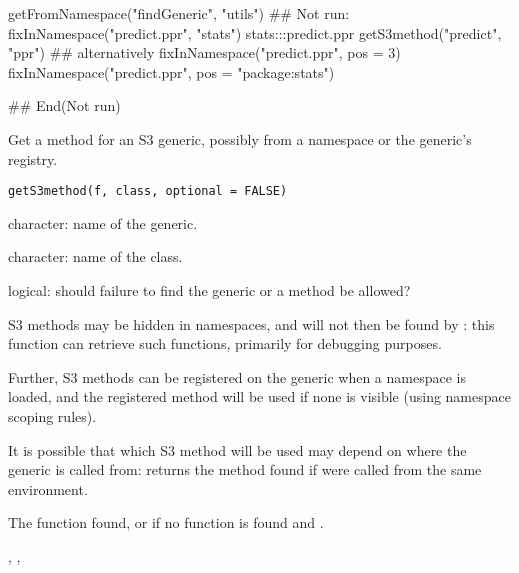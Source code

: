 %
\begin{Examples}
\begin{ExampleCode}
getFromNamespace("findGeneric", "utils")
## Not run: 
fixInNamespace("predict.ppr", "stats")
stats:::predict.ppr
getS3method("predict", "ppr")
## alternatively
fixInNamespace("predict.ppr", pos = 3)
fixInNamespace("predict.ppr", pos = "package:stats")

## End(Not run)
\end{ExampleCode}
\end{Examples}
%
\begin{Description}\relax
Get a method for an S3 generic, possibly from a namespace or the
generic's registry.
\end{Description}
%
\begin{Usage}
\begin{verbatim}
getS3method(f, class, optional = FALSE)
\end{verbatim}
\end{Usage}
%
\begin{Arguments}
\begin{ldescription}
\item[\code{f}] character: name of the generic.
\item[\code{class}] character: name of the class.
\item[\code{optional}] logical: should failure to find the generic or a
method be allowed?
\end{ldescription}
\end{Arguments}
%
\begin{Details}\relax
S3 methods may be hidden in namespaces, and will not
then be found by : this function can retrieve
such functions, primarily for debugging purposes.

Further, S3 methods can be registered on the generic when a namespace
is loaded, and the registered method will be used if none is visible
(using namespace scoping rules).

It is possible that which S3 method will be used may depend on where
the generic  is called from:  returns the
method found if  were called from the same environment.
\end{Details}
%
\begin{Value}
The function found, or  if no function is found and
.
\end{Value}
%
\begin{SeeAlso}\relax
{}, , 
\end{SeeAlso}
